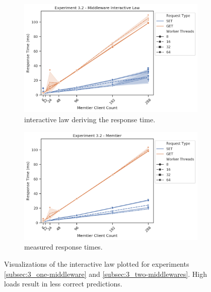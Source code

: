 \begin{figure}
{                \centering
                \begin{subfigure}[t!]{0.55\textwidth}
                    \centering
                    \includegraphics[width=1\textwidth]{../data_analysis/figures/3-2_mw_response-time-il.png}
                    \caption{\mw{} interactive law deriving the response time.\label{fig:mw_rt-il}}
                \end{subfigure}
                \begin{subfigure}[t!]{0.55\textwidth}
                    \centering
                    \includegraphics[width=1\textwidth]{../data_analysis/figures/3-2_mt_response_time.png}
                    \caption{\cli{} measured response times.\label{fig:mt_rt}}
                \end{subfigure}
            }
            \caption{Visualizations of the interactive law plotted for experiments \ref{subsec:3_one-middleware} and
                     \ref{subsec:3_two-middlewares}. High loads result in less correct predictions.\label{fig:3_il}}
        \end{figure}
